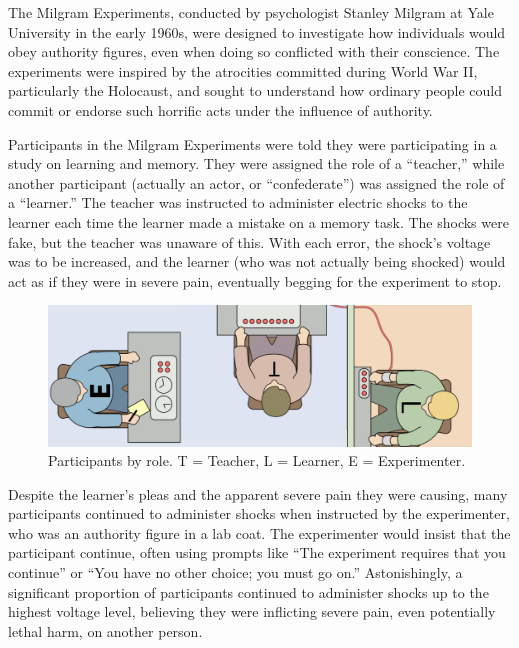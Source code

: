 \documentclass[
]{book}
\begin{document}
The Milgram Experiments, conducted by psychologist Stanley Milgram at Yale University in the early 1960s, were designed to investigate how individuals would obey authority figures, even when doing so conflicted with their conscience. The experiments were inspired by the atrocities committed during World War II, particularly the Holocaust, and sought to understand how ordinary people could commit or endorse such horrific acts under the influence of authority.

Participants in the Milgram Experiments were told they were participating in a study on learning and memory. They were assigned the role of a ``teacher,'' while another participant (actually an actor, or ``confederate'') was assigned the role of a ``learner.'' The teacher was instructed to administer electric shocks to the learner each time the learner made a mistake on a memory task. The shocks were fake, but the teacher was unaware of this. With each error, the shock's voltage was to be increased, and the learner (who was not actually being shocked) would act as if they were in severe pain, eventually begging for the experiment to stop.

\begin{figure}
\centering
\includegraphics[width=1\textwidth,height=\textheight]{images/Milgram_experiment.png}
\caption{Participants by role. T = Teacher, L = Learner, E = Experimenter.}
\end{figure}

Despite the learner's pleas and the apparent severe pain they were causing, many participants continued to administer shocks when instructed by the experimenter, who was an authority figure in a lab coat. The experimenter would insist that the participant continue, often using prompts like ``The experiment requires that you continue'' or ``You have no other choice; you must go on.'' Astonishingly, a significant proportion of participants continued to administer shocks up to the highest voltage level, believing they were inflicting severe pain, even potentially lethal harm, on another person.
\end{document}
